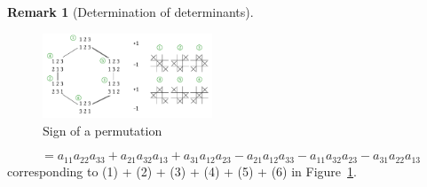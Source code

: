\documentclass[a4paper,landscape,twocolumn]{article}
\theoremstyle{definition}
\newtheorem{rem}{Remark}
\begin{document}
\begin{rem}[Determination of determinants]
  \begin{figure}[!h]
    \begin{center}
      \includegraphics[width=0.45\textwidth]{img/sign-of-permutation.pdf}
      \caption{Sign of a permutation}
      \label{img:perm-sign}
    \end{center}
  \end{figure}

  \[ = a_{11} a_{22} a_{33} + a_{21} a_{32} a_{13} + a_{31} a_{12} a_{23} - a_{21} a_{12} a_{33} - a_{11} a_{32} a_{23} - a_{31} a_{22} a_{13} \]
  corresponding to (1) + (2) + (3) + (4) + (5) + (6) in Figure~\ref{img:perm-sign}.
\end{rem}
\end{document}
